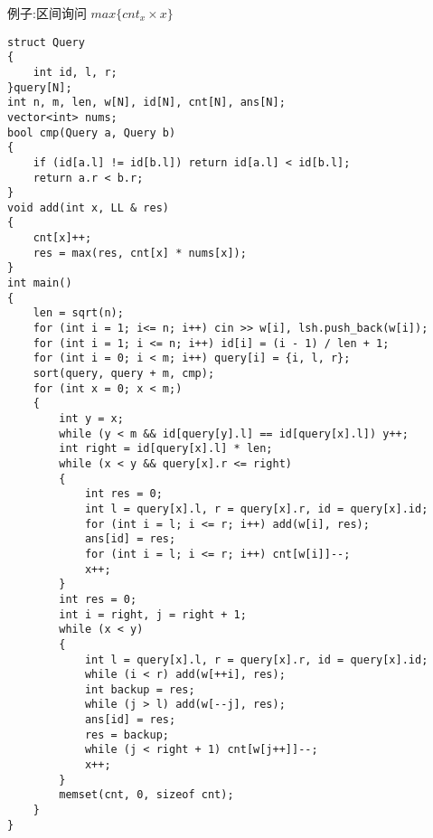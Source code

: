 \documentclass[a4paper, fontset=none]{ctexart}
\begin{document}
例子:区间询问 $max\{cnt_x\times x\}$
\begin{verbatim}
struct Query
{
    int id, l, r;
}query[N];
int n, m, len, w[N], id[N], cnt[N], ans[N];
vector<int> nums;
bool cmp(Query a, Query b)
{
    if (id[a.l] != id[b.l]) return id[a.l] < id[b.l];
    return a.r < b.r;
}
void add(int x, LL & res)
{
    cnt[x]++;
    res = max(res, cnt[x] * nums[x]);
}
int main()
{
    len = sqrt(n);
    for (int i = 1; i<= n; i++) cin >> w[i], lsh.push_back(w[i]);
    for (int i = 1; i <= n; i++) id[i] = (i - 1) / len + 1;
    for (int i = 0; i < m; i++) query[i] = {i, l, r};
    sort(query, query + m, cmp);
    for (int x = 0; x < m;)
    {
        int y = x;
        while (y < m && id[query[y].l] == id[query[x].l]) y++;
        int right = id[query[x].l] * len;
        while (x < y && query[x].r <= right)
        {
            int res = 0;
            int l = query[x].l, r = query[x].r, id = query[x].id;
            for (int i = l; i <= r; i++) add(w[i], res);
            ans[id] = res;
            for (int i = l; i <= r; i++) cnt[w[i]]--;
            x++;
        }
        int res = 0;
        int i = right, j = right + 1;
        while (x < y)
        {
            int l = query[x].l, r = query[x].r, id = query[x].id;
            while (i < r) add(w[++i], res);
            int backup = res;
            while (j > l) add(w[--j], res);
            ans[id] = res;
            res = backup;
            while (j < right + 1) cnt[w[j++]]--;
            x++;
        }
        memset(cnt, 0, sizeof cnt);
    }
}
\end{verbatim}
\end{document}
